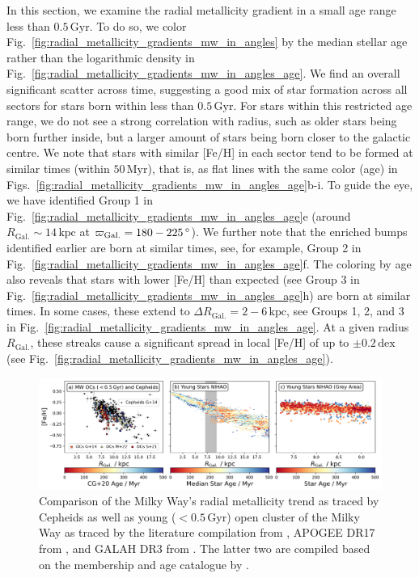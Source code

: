 \documentclass[fleqn,usenatbib]{mnras}
\newcommand{\nihaoAGEmax}{$0.5\,\mathrm{Gyr}$}
\begin{document}
In this section, we examine the radial metallicity gradient in a small age range less than \nihaoAGEmax. To do so, we color Fig.~\ref{fig:radial_metallicity_gradients_mw_in_angles} by the median stellar age rather than the logarithmic density in Fig.~\ref{fig:radial_metallicity_gradients_mw_in_angles_age}. We find an overall significant scatter across time, suggesting a good mix of star formation across all sectors for stars born within less than \nihaoAGEmax. For stars within this restricted age range, we do not see a strong correlation with radius, such as older stars being born further inside, but a larger amount of stars being born closer to the galactic centre. We note that stars with similar [Fe/H] in each sector tend to be formed at similar times (within $50\,\mathrm{Myr}$), that is, as flat lines with the same color (age) in Figs.~\ref{fig:radial_metallicity_gradients_mw_in_angles_age}b-i. To guide the eye, we have identified Group 1 in Fig.~\ref{fig:radial_metallicity_gradients_mw_in_angles_age}e (around $R_\mathrm{Gal.} \sim 14\,\mathrm{kpc}$ at $\varpi_\mathrm{Gal.} = 180-225\,\mathrm{\degree}$). We further note that the enriched bumps identified earlier are born at similar times, see, for example, Group 2 in Fig.~\ref{fig:radial_metallicity_gradients_mw_in_angles_age}f. The coloring by age also reveals that stars with lower [Fe/H] than expected (see Group 3 in Fig.~\ref{fig:radial_metallicity_gradients_mw_in_angles_age}h) are born at similar times. In some cases, these extend to $\Delta R_\mathrm{Gal.} = 2-6\,\mathrm{kpc}$, see Groups 1, 2, and 3 in Fig.~\ref{fig:radial_metallicity_gradients_mw_in_angles_age}. At a given radius $R_\mathrm{Gal.}$, these streaks cause a significant spread in local [Fe/H] of up to $\pm 0.2\,\mathrm{dex}$ (see Fig.~\ref{fig:radial_metallicity_gradients_mw_in_angles_age}).

\begin{figure}
    \centering
    \includegraphics[width=\textwidth]{figures/radial_metallicity_gradients_mw_vs_nihao.png}
    \caption{Comparison of the Milky Way's radial metallicity trend as traced by Cepheids \citep[black triangles, compiled from literature by][G+14]{Genovali2014} as well as young ($<$\nihaoAGEmax) open cluster of the Milky Way as traced by the literature compilation from \citet[][G+14 as squares]{Genovali2014}, APOGEE DR17 from \citet[][M+22 as crosses]{Myers2022}, and GALAH DR3 from \citet[][S+21 as circles]{Spina2021}. The latter two are compiled based on the membership and age catalogue by \citet[][CG+20]{CantatGaudin2020}.
    }
    \label{fig:radial_metallicity_gradients_mw_vs_nihao}
\end{figure}
\end{document}
